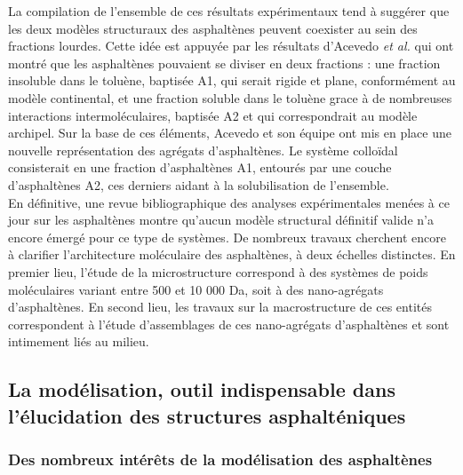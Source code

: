 La compilation de l'ensemble de ces résultats expérimentaux tend à suggérer que les deux modèles structuraux des asphaltènes peuvent coexister au sein des fractions lourdes. Cette idée est appuyée par les résultats d'Acevedo \textit{et al.} \cite{acevedo2004structural, gutierrez2001fractionation} qui ont montré que les asphaltènes pouvaient se diviser en deux fractions : une fraction insoluble dans le toluène, baptisée A1, qui serait rigide et plane, conformément au modèle continental, et une fraction soluble dans le toluène grace à de nombreuses interactions intermoléculaires, baptisée A2 et qui correspondrait au modèle archipel. Sur la base de ces éléments, Acevedo et son équipe ont mis en place une nouvelle représentation des agrégats d'asphaltènes. Le système colloïdal consisterait en une fraction d'asphaltènes A1, entourés par une couche d'asphaltènes A2, ces derniers aidant à la solubilisation de l'ensemble. \\
En définitive, une revue bibliographique des analyses expérimentales menées à ce jour sur les asphaltènes montre qu'aucun modèle structural définitif valide n'a encore émergé pour ce type de systèmes. De nombreux travaux cherchent encore à clarifier l'architecture moléculaire des asphaltènes, à deux échelles distinctes. En premier lieu, l'étude de la microstructure correspond à des systèmes de poids moléculaires variant entre 500 et 10 000 Da, soit à des nano-agrégats d'asphaltènes. En second lieu, les travaux sur la macrostructure de ces entités correspondent à l'étude d'assemblages de ces nano-agrégats d'asphaltènes et sont intimement liés au milieu. 



\subsection{La modélisation, outil indispensable dans l'élucidation des structures asphalténiques}

\subsubsection{Des nombreux intérêts de la modélisation des asphaltènes}

